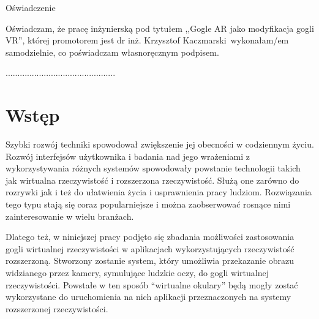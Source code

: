 \documentclass[a4paper,11pt,twoside]{report}
\theoremstyle{definition}
\newcommand{\tytul}{Gogle AR jako modyfikacja gogli VR}
\renewcommand{\title}{AR googles as modified VR googles}
\newcommand{\type}{inżyniers} %
\newcommand{\supervisor}{dr inż. Krzysztof Kaczmarski}
\begin{document}
\begin{center}
Oświadczenie %
\end{center}

\indent Oświadczam, że pracę \type ką pod
tytułem ,,\tytul '', której promotorem jest \supervisor \ wykonałam/em
samodzielnie, co poświadczam własnoręcznym podpisem.
\vspace{2cm}



\begin{flushright}
  \begin{minipage}{50mm}
    \begin{center}
      ..............................................

    \end{center}
  \end{minipage}
\end{flushright}

\thispagestyle{empty}
\newpage

\null\thispagestyle{empty}\newpage

\tableofcontents
\thispagestyle{empty}
\newpage
\null\thispagestyle{empty}\newpage
\setcounter{page}{11}
\pagestyle{fancy}


\chapter*{Wstęp} %

Szybki rozwój techniki spowodował zwiększenie jej obecności w codziennym życiu. Rozwój interfejsów użytkownika i badania nad jego wrażeniami z wykorzystywania różnych systemów spowodowały powstanie technologii takich jak wirtualna rzeczywistość i rozszerzona rzeczywistość. Służą one zarówno do rozrywki jak i też do ułatwienia życia i usprawnienia pracy ludziom. Rozwiązania tego typu stają się coraz popularniejsze i można zaobserwować rosnące nimi zainteresowanie w wielu branżach.

Dlatego też, w niniejszej pracy podjęto się zbadania możliwości zastosowania gogli wirtualnej rzeczywistości w aplikacjach wykorzystujących rzeczywistość rozszerzoną. Stworzony zostanie system, który umożliwia przekazanie obrazu widzianego przez kamery, symulujące ludzkie oczy, do gogli wirtualnej rzeczywistości. Powstałe w ten sposób ``wirtualne okulary'' będą mogły zostać wykorzystane do uruchomienia na nich aplikacji przeznaczonych na systemy rozszerzonej rzeczywistości.
\end{document}
